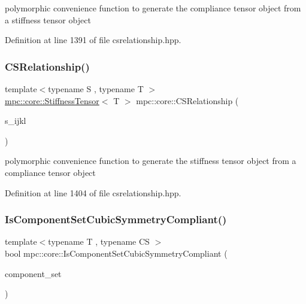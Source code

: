 polymorphic convenience function to generate the compliance tensor object from a stiffness tensor object 



Definition at line 1391 of file csrelationship.\+hpp.

\mbox{\label{namespacempc_1_1core_aea25821c5c4e736c92d4ede4d7f3241d}} 
\subsubsection{\texorpdfstring{C\+S\+Relationship()}{CSRelationship()}\hspace{0.1cm}{\footnotesize\ttfamily [2/2]}}
{\footnotesize\ttfamily template$<$typename S , typename T $>$ \\
\mbox{\hyperlink{structmpc_1_1core_1_1_stiffness_tensor}{mpc\+::core\+::\+Stiffness\+Tensor}}$<$ T $>$ mpc\+::core\+::\+C\+S\+Relationship (\begin{DoxyParamCaption}\item[{\mbox{\hyperlink{structmpc_1_1core_1_1_compliance_tensor}{mpc\+::core\+::\+Compliance\+Tensor}}$<$ T $>$ \&}]{s\+\_\+ijkl }\end{DoxyParamCaption})}



polymorphic convenience function to generate the stiffness tensor object from a compliance tensor object 



Definition at line 1404 of file csrelationship.\+hpp.

\mbox{\label{namespacempc_1_1core_a24497694376335a8c2e32fc7b1bd22fd}} 
\subsubsection{\texorpdfstring{Is\+Component\+Set\+Cubic\+Symmetry\+Compliant()}{IsComponentSetCubicSymmetryCompliant()}}
{\footnotesize\ttfamily template$<$typename T , typename CS $>$ \\
bool mpc\+::core\+::\+Is\+Component\+Set\+Cubic\+Symmetry\+Compliant (\begin{DoxyParamCaption}\item[{const std\+::set$<$ \mbox{\hyperlink{namespacempc_1_1core_ac3a232afc7c680d580628e834030482f}{mpc\+::core\+::\+Tensor\+Rank4\+Component}}$<$ T $>$ $>$ \&}]{component\+\_\+set }\end{DoxyParamCaption})}



